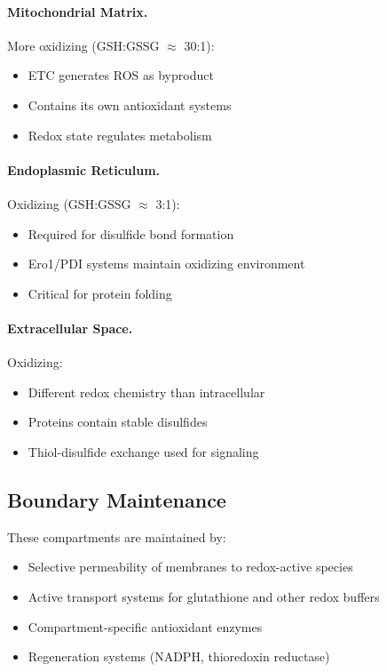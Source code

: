 \paragraph{Mitochondrial Matrix.} More oxidizing (GSH:GSSG $\approx$ 30:1):
\begin{itemize}
    \item ETC generates ROS as byproduct
    \item Contains its own antioxidant systems
    \item Redox state regulates metabolism
\end{itemize}

\paragraph{Endoplasmic Reticulum.} Oxidizing (GSH:GSSG $\approx$ 3:1):
\begin{itemize}
    \item Required for disulfide bond formation
    \item Ero1/PDI systems maintain oxidizing environment
    \item Critical for protein folding
\end{itemize}

\paragraph{Extracellular Space.} Oxidizing:
\begin{itemize}
    \item Different redox chemistry than intracellular
    \item Proteins contain stable disulfides
    \item Thiol-disulfide exchange used for signaling
\end{itemize}

\subsection{Boundary Maintenance}

These compartments are maintained by:
\begin{itemize}
    \item Selective permeability of membranes to redox-active species
    \item Active transport systems for glutathione and other redox buffers
    \item Compartment-specific antioxidant enzymes
    \item Regeneration systems (NADPH, thioredoxin reductase)
\end{itemize}

